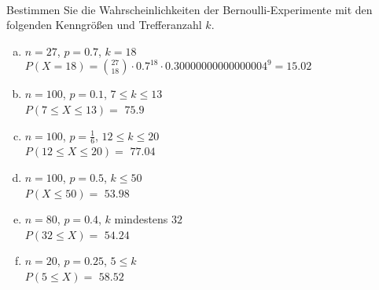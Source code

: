 \begin{aufgabe} ~ \\ 
Bestimmen Sie die Wahrscheinlichkeiten der Bernoulli-Experimente mit den folgenden Kenngrößen und Trefferanzahl $k$.\begin{multicols}{2} 
\begin{enumerate}[a)] 
\item 
$n=27$, $p=0.7$, $k=18$\\ 
$P(X=18)=\binom{27}{18}\cdot0.7^{18}\cdot0.30000000000000004^{9}=15.02$
\item 
$n=100$, $p=0.1$, $7\leq k \leq 13$\\ 
$P(7\leq X \leq 13)=$ $75.9$
\item 
$n=100$, $p=\frac{1}{6}$, $12\leq k \leq 20$\\ 
$P(12\leq X \leq 20)=$ $77.04$
\item 
$n=100$, $p=0.5$, $k \leq 50$\\ 
$P(X \leq 50)=$ $53.98$
\item 
$n=80$, $p=0.4$, $k$ mindestens $32$\\ 
$P(32\leq X)=$ $54.24$
\item 
$n=20$, $p=0.25$, $5\leq k $\\ 
$P(5\leq X)=$ $58.52$
\end{enumerate} 
\end{multicols} 
\end{aufgabe} 
